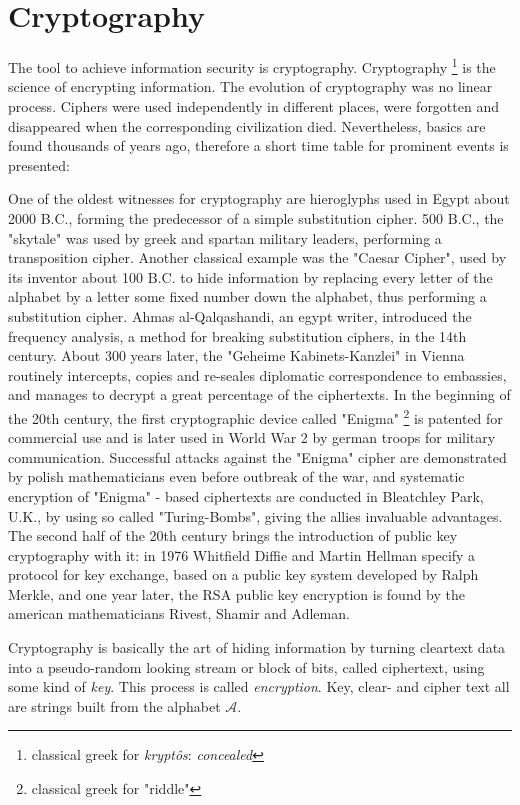 \section{Cryptography}

The tool to achieve information security is cryptography.
Cryptography \footnote{classical greek for \textit{krypt\^{o}s}: \textit{concealed}}
is the science of encrypting information. The evolution of cryptography was no linear process. Ciphers were used independently in different
places, were forgotten and disappeared when the corresponding civilization died. Nevertheless,
basics are found thousands of years ago, therefore a short time table for prominent events is presented:

One of the oldest witnesses for cryptography are hieroglyphs used in Egypt about 2000 B.C., forming the predecessor
of a simple substitution cipher. 500 B.C., the "skytale" was used by greek and spartan military leaders, performing a transposition cipher. Another classical
example was the "Caesar Cipher", used by its inventor about 100 B.C. to hide information by replacing every letter of the alphabet by a letter some fixed number down the alphabet,
thus performing a substitution cipher. Ahmas al-Qalqashandi, an egypt writer, introduced the frequency analysis, a method for breaking substitution ciphers,
in the 14th century. About 300 years later, the "Geheime Kabinets-Kanzlei" in Vienna routinely intercepts, copies and 
 re-seales diplomatic correspondence to embassies, and manages to decrypt a great percentage of the ciphertexts. In the beginning of the 20th century, the 
 first cryptographic device called "Enigma" \footnote{classical greek for "riddle"} is patented for commercial use and is later used in World War 2 by german troops for 
 military communication. Successful attacks against the "Enigma" cipher are demonstrated by polish mathematicians even before outbreak of the war, and systematic
 encryption of "Enigma" - based ciphertexts are conducted in Bleatchley Park, U.K., by using so called "Turing-Bombs", giving the allies invaluable advantages.
The second half of the 20th century brings the introduction of public key cryptography with it: in 1976 Whitfield Diffie and Martin Hellman specify a 
protocol for key exchange, based on a public key system developed by Ralph Merkle, and one year later, the RSA public key encryption is found by the american
mathematicians Rivest, Shamir and Adleman.


Cryptography is basically the art of hiding information by turning cleartext
data into a 
pseudo-random looking stream or block of bits, called ciphertext, using some kind of
\textit{key}. This process is called \textit{encryption}. Key, clear- and cipher text all are strings built from the alphabet $\mathcal{A}$. 

